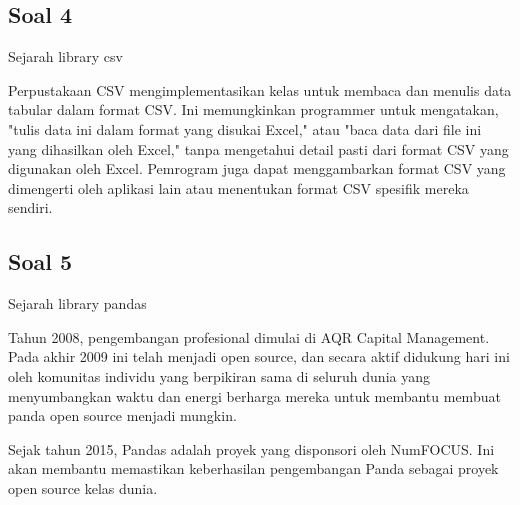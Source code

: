 \subsection{Soal 4}
Sejarah library csv

Perpustakaan CSV mengimplementasikan kelas untuk membaca dan menulis data tabular dalam format CSV. Ini memungkinkan programmer untuk mengatakan, "tulis data ini dalam format yang disukai Excel," atau "baca data dari file ini yang dihasilkan oleh Excel," tanpa mengetahui detail pasti dari format CSV yang digunakan oleh Excel. Pemrogram juga dapat menggambarkan format CSV yang dimengerti oleh aplikasi lain atau menentukan format CSV spesifik mereka sendiri.
	

\subsection{Soal 5}
Sejarah library pandas

Tahun 2008, pengembangan profesional dimulai di AQR Capital Management. Pada akhir 2009 ini telah menjadi open source, dan secara aktif didukung hari ini oleh komunitas individu yang berpikiran sama di seluruh dunia yang menyumbangkan waktu dan energi berharga mereka untuk membantu membuat panda open source menjadi mungkin.

	Sejak tahun 2015, Pandas adalah proyek yang disponsori oleh NumFOCUS. Ini akan membantu memastikan keberhasilan pengembangan Panda sebagai proyek open source kelas dunia.
	

